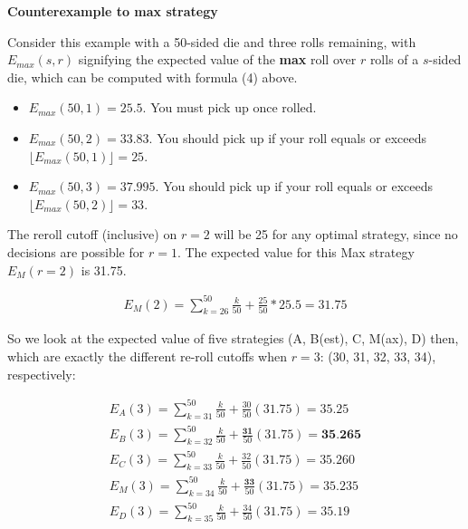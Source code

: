 \documentclass[11pt, oneside]{article} 	%
\begin{document}
\textbf{Counterexample to max strategy}

Consider this example with a 50-sided die and three rolls remaining, with $E_{max}(s, r)$ signifying the expected value of the \textbf{max} roll over $r$ rolls of a $s$-sided die, which can be computed with formula (4) above.

\begin{itemize}
\item $E_{max}(50, 1) = 25.5$. You must pick up once rolled.
\item $E_{max}(50,2) = 33.83$. You should pick up if your roll equals or exceeds $\lfloor E_{max}(50, 1)\rfloor = 25$.
\item $E_{max}(50,3) = 37.995$. You should pick up if your roll equals or exceeds $\lfloor E_{max}(50,2) \rfloor = 33$.
\end{itemize}
 

The reroll cutoff (inclusive) on $r=2$ will be 25 for any optimal strategy, since no decisions are possible for $r=1$. The expected value for this Max strategy $E_M(r  = 2)$ is 31.75.

\begin{align}
E_M(2)  = \sum_{k=26}^{50} \frac{k}{50} + \frac{25}{50}*25.5 = 31.75 
\end{align}

So we look at the expected value of five strategies (A, B(est), C, M(ax), D) then, which are exactly the different re-roll cutoffs when $r=3$: (30, 31, 32, 33, 34), respectively:

\begin{align}
E_A(3) = \sum_{k=31}^{50} \frac{k}{50} + \frac{30}{50} (31.75) = 35.25 \\
E_B(3) = \sum_{k=32}^{50} \frac{k}{50} + \frac{\textbf{31}}{50} (31.75) = \textbf{35.265} \\
E_C(3) =  \sum_{k=33}^{50} \frac{k}{50} + \frac{32}{50} (31.75) = 35.260 \\
E_M(3) = \sum_{k=34}^{50} \frac{k}{50} + \frac{\textbf{33}}{50}(31.75) = 35.235 \\
E_D(3) = \sum_{k=35}^{50} \frac{k}{50} + \frac{34}{50} (31.75) = 35.19
\end{align}
\end{document}
